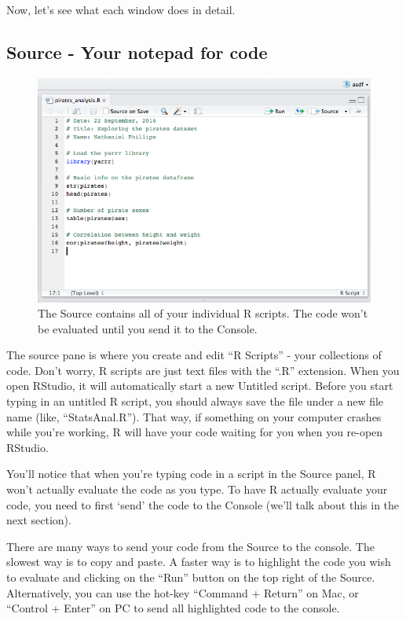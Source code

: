 \documentclass[
]{book}
\begin{document}
Now, let's see what each window does in detail.

\hypertarget{source---your-notepad-for-code}{%
\subsection{Source - Your notepad for code}\label{source---your-notepad-for-code}}

\begin{figure}

{\centering \includegraphics[width=1\linewidth]{images/piratesanalysisss} 

}

\caption{The Source contains all of your individual R scripts. The code won't be evaluated until you send it to the Console.}\label{fig:sourcewindow}
\end{figure}

The source pane is where you create and edit ``R Scripts'' - your collections of code. Don't worry, R scripts are just text files with the ``.R'' extension. When you open RStudio, it will automatically start a new Untitled script. Before you start typing in an untitled R script, you should always save the file under a new file name (like, ``StatsAnal.R''). That way, if something on your computer crashes while you're working, R will have your code waiting for you when you re-open RStudio.

You'll notice that when you're typing code in a script in the Source panel, R won't actually evaluate the code as you type. To have R actually evaluate your code, you need to first `send' the code to the Console (we'll talk about this in the next section).

There are many ways to send your code from the Source to the console. The slowest way is to copy and paste. A faster way is to highlight the code you wish to evaluate and clicking on the ``Run'' button on the top right of the Source. Alternatively, you can use the hot-key ``Command + Return'' on Mac, or ``Control + Enter'' on PC to send all highlighted code to the console.
\end{document}
